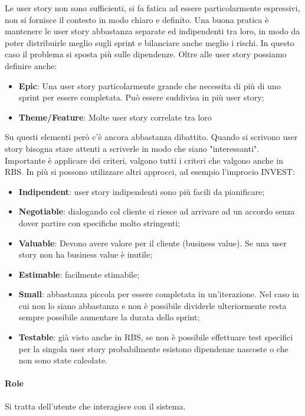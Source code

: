 \noindent Le user story non sono sufficienti, si fa fatica ad essere particolarmente espressivi, non si fornisce il contesto in modo chiaro e definito.
Una buona pratica è mantenere le user story abbastanza separate ed indipendenti tra loro, in modo da poter distribuirle meglio sugli sprint e bilanciare anche meglio i rischi. In questo caso il problema si sposta più sulle dipendenze.
Oltre alle user story possiamo definire anche:
\begin{itemize}
	\item \textbf{Epic}: Una user story particolarmente grande che necessita di più di uno sprint per essere completata. Può essere suddivisa in più user story;
	\item \textbf{Theme/Feature}: Molte user story correlate tra loro
\end{itemize}
Su questi elementi però c'è ancora abbastanza dibattito.
Quando si scrivono user story bisogna stare attenti a scriverle in modo che siano "interessanti". Importante è applicare dei criteri, valgono tutti i criteri che valgono anche in RBS. In più si possono utilizzare altri approcci, ad esempio l'improcio INVEST:
\begin{itemize}
	\item \textbf{Indipendent}: user story indipendenti sono più facili da pianificare;
	\item \textbf{Negotiable}: dialogando col cliente si riesce ad arrivare ad un accordo senza dover partire con specifiche molto stringenti;
	\item \textbf{Valuable}: Devono avere valore per il cliente (business value). Se una user story non ha business value è inutile;
	\item \textbf{Estimable}: facilmente stimabile;
	\item \textbf{Small}: abbastanza piccola per essere completata in un'iterazione. Nel caso in cui non lo siano abbastanza e non è possibile dividerle ulteriormente resta sempre possibile aumentare la durata dello sprint;
	\item \textbf{Testable}: già visto anche in RBS, se non è possibile effettuare test specifici per la singola user story probabilmente esistono dipendenze nascoste o che non sono state calcolate.
\end{itemize}
\paragraph{Role}
Si tratta dell'utente che interagisce con il sistema.

